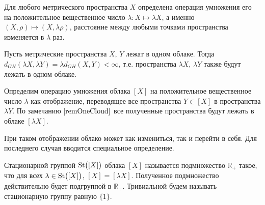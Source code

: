 Для любого метрического пространства $X$ определена операция умножения его
на положительное вещественное число $\lambda\colon X\mapsto \lambda X$, а именно
$(X, \rho) \mapsto (X, \lambda \rho)$, расстояние между любыми точками
пространства изменяется в $\lambda$ раз.
\begin{remark} Пусть метрические
  пространства $X$, $Y$ лежат в одном облаке. Тогда
  $d_{GH}(\lambda X, \lambda Y) = \lambda d_{GH}(X,Y) < \infty$, т.е.
  пространства
  $\lambda X$, $\lambda Y$ также будут лежать в одном облаке.
  \label{remOneCloud}
\end{remark}
\begin{definition}Определим операцию умножения облака $[X]$ на
  положительное вещественное
  число $\lambda$ как отображение, переводящее все пространства $Y \in [X]$ в
  пространства $\lambda Y$. По замечанию $\ref{remOneCloud}$ все
  полученные пространства будут
  лежать в облаке $[\lambda X]$.
\end{definition}

При таком отображении облако может как
измениться, так и перейти в себя. Для последнего случая вводится специальное
определение.
\begin{definition}
  Стационарной группой $\operatorname{St}\bigl([X]\bigr)$ облака $[X]$
  называется подмножество $\mathbb{R}_+$ такое, что для всех
  $\lambda \in \operatorname{St}\bigl([X]\bigr)$, $[X] = [\lambda X]$. Полученное подмножество
  действительно будет подгруппой в $\mathbb{R}_+$. Тривиальной
  будем называть стационарную группу равную $\{1\}$.
\end{definition}

